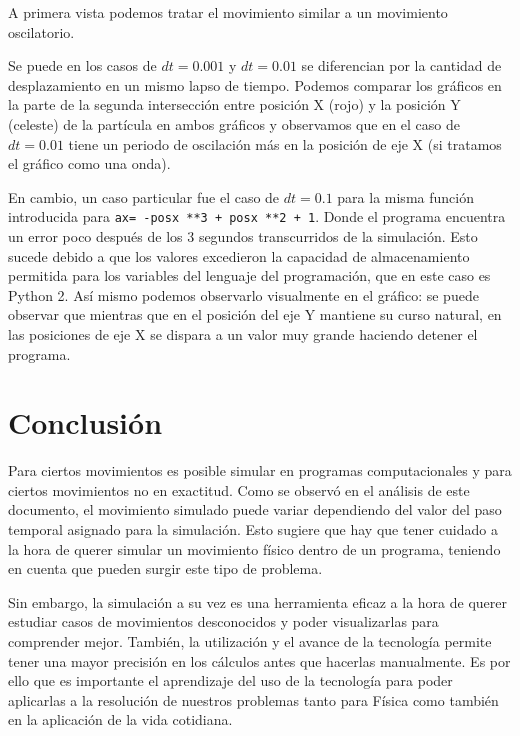 \documentclass[12pt, a4paper]{article}
\begin{document}
A primera vista podemos tratar el movimiento similar a un movimiento oscilatorio. 


Se puede en los casos de $dt=0.001$ y $dt=0.01$ se diferencian por la cantidad de desplazamiento en un mismo lapso de tiempo. Podemos comparar los gráficos en la parte de la segunda intersección entre posición X (rojo) y la posición Y (celeste) de la partícula en ambos gráficos y observamos que en el caso de $dt=0.01$ tiene un periodo de oscilación más en la posición de eje X (si tratamos el gráfico como una onda). 

En cambio, un caso particular fue el caso de $dt=0.1$ para la misma función introducida para \texttt{ax= -posx **3 + posx **2 + 1}. Donde el programa encuentra un error poco después de los 3 segundos transcurridos de la simulación. Esto sucede debido a que los valores excedieron la capacidad de almacenamiento permitida para los variables del lenguaje del programación, que en este caso es Python 2. Así mismo podemos observarlo visualmente en el gráfico: se puede observar que mientras que en el posición del eje Y mantiene su curso natural, en las posiciones de eje X se dispara a un valor muy grande haciendo detener el programa.

\section{Conclusión}
Para ciertos movimientos es posible simular en programas computacionales y para ciertos movimientos no en exactitud. Como se observó en el análisis de este documento, el movimiento simulado puede variar dependiendo del valor del paso temporal asignado para la simulación. Esto sugiere que hay que tener cuidado a la hora de querer simular un movimiento físico dentro de un programa, teniendo en cuenta que pueden surgir este tipo de problema.

Sin embargo, la simulación a su vez es una herramienta  eficaz a la hora de querer estudiar casos de movimientos desconocidos y poder visualizarlas para comprender mejor. También, la utilización y el avance de la tecnología  permite tener una mayor precisión en los cálculos antes que hacerlas manualmente. Es por ello que es importante el aprendizaje del uso de la tecnología para poder aplicarlas a la resolución de nuestros problemas tanto para Física como también en la aplicación de la vida cotidiana. 
\end{document}
